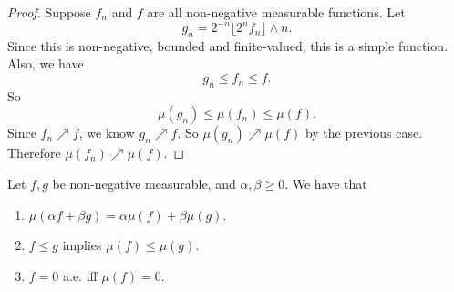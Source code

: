 \documentclass[a4paper]{article}
\begin{document}
\begin{proof}
  \separator

  Suppose $f_n$ and $f$ are all non-negative measurable functions. Let
  \[
    g_n = 2^{-n} \lfloor 2^n f_n\rfloor \wedge n.
  \]
  Since this is non-negative, bounded and finite-valued, this is a simple function. Also, we have
  \[
    g_n \leq f_n \leq f.
  \]
  So
  \[
    \mu(g_n) \leq \mu(f_n) \leq \mu(f).
  \]
  Since $f_n \nearrow f$, we know $g_n \nearrow f$. So $\mu(g_n) \nearrow \mu(f)$ by the previous case. Therefore $\mu(f_n) \nearrow \mu(f)$.
\end{proof}

\begin{thm}
  Let $f, g$ be non-negative measurable, and $\alpha, \beta \geq 0$. We have that
  \begin{enumerate}
    \item $\mu(\alpha f + \beta g) = \alpha \mu(f) + \beta \mu(g)$.
    \item $f \leq g$ implies $\mu(f) \leq \mu(g)$.
    \item $f = 0$ a.e. iff $\mu(f) = 0$.
  \end{enumerate}
\end{thm}
\end{document}
